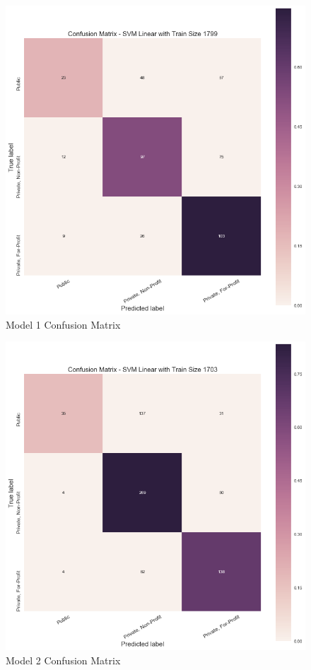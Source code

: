 \documentclass[10pt,twocolumn]{article}
\begin{document}
\begin{figure}[!t]
  \begin{center}
    \includegraphics[width=6in]{MODEL1_80trainsize.png}
  \end{center}

  \caption{\small Model 1 Confusion Matrix}
  \label{fig-1}
\end{figure}

\begin{figure}[!t]
  \begin{center}
    \includegraphics[width=6in]{MODEL2_trainsize70.png}
  \end{center}

  \caption{\small Model 2 Confusion Matrix}
  \label{fig-1}
\end{figure}
\end{document}
